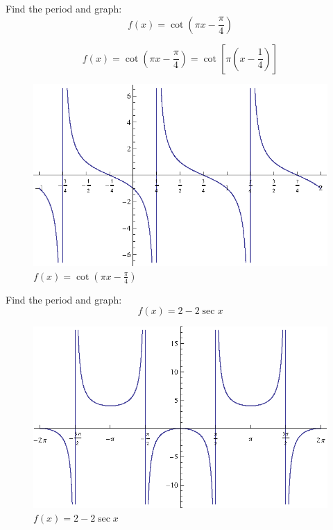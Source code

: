 \documentclass[fleqn,addpoints]{exam}
\begin{document}
\begin{questions}
\begin{solution}
        \end{solution}


        \question[10]
          Find the period and graph:
          \[
            f(x) = \cot \left( \pi x - \frac{\pi}{4} \right)
          \]

          \begin{solution}
            \[
              f(x) = \cot \left( \pi x - \frac{\pi}{4} \right) = \cot \left[ \pi \left( x - \frac{1}{4} \right) \right ]
            \]

            \begin{figure}[H]
              \centering
              \includegraphics{graph2.eps}
              \caption{$f(x) = \cot \left( \pi x - \frac{\pi}{4} \right)$}
            \end{figure}

          \end{solution}

        \question[10]
        Find the period and graph:
          \[
            f(x) = 2 - 2 \sec x
          \]

          \begin{solution}
            \begin{figure}[H]
              \centering
              \includegraphics[scale=1.0]{graph3.eps}
              \caption{$f(x) = 2 - 2 \sec x $}
            \end{figure}


\end{solution}
\end{questions}
\end{document}
